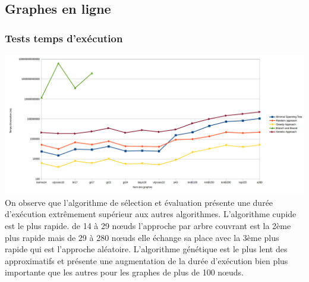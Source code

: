 \documentclass[10pt,a4paper]{report}
\begin{document}
	\subsection{Graphes en ligne}
		\subsubsection{Tests temps d'exécution}
			\includegraphics[scale=0.45]{./Ressource/temps_graphes_site.png}			
			On observe que l'algorithme de sélection et évaluation présente une durée d'exécution extrêmement supérieur aux autres algorithmes.
			L'algorithme cupide est le plus rapide. de 14 à 29 nœuds l'approche par arbre couvrant est la 2ème plus rapide mais de 29 à 280 nœuds elle échange sa place avec la 3ème plus rapide qui est l'approche aléatoire.
			L'algorithme génétique est le plus lent des approximatifs et présente une augmentation de la durée d'exécution bien plus importante que les autres pour les graphes de plus de 100 nœuds.
		
	
\end{document}
